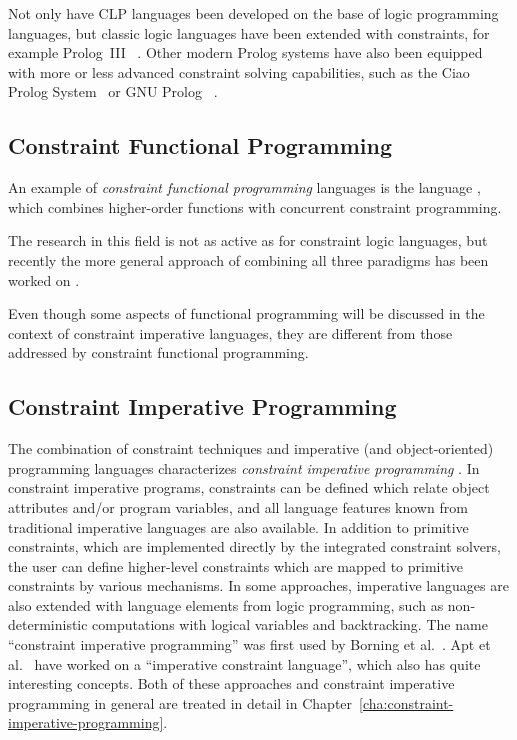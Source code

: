 Not only have CLP languages been developed on the base of logic
programming languages, but classic logic languages have been extended
with constraints, for example Prolog~III%
~\cite{colmerauer90prologIII}.  Other modern Prolog
systems have also been equipped with more or less advanced constraint
solving capabilities, such as the Ciao Prolog%
 System~\cite{bueno02ciao} or GNU
Prolog%
~\cite{gnuProlog}.


\subsection{Constraint Functional Programming}
\label{sec:constraint-functional-programming}

An example of {\em constraint functional programming}%
 languages is the language
\goffin{}%
 \cite{chakravarty97goffin}, which combines higher-order
functions with concurrent constraint programming.

The research in this field is not as active as for constraint logic
languages, but recently the more general approach of combining all
three paradigms has been worked on \cite{Hofstedt_02B,
  KobayashiMarinIdaChe.WFLP02}.

Even though some aspects of functional programming will be discussed
in the context of constraint imperative languages, they are different
from those addressed by constraint functional programming.

\subsection{Constraint Imperative Programming}

The combination of constraint techniques and imperative (and
object-oriented) programming languages characterizes {\em constraint
  imperative programming}%
.  In constraint imperative
programs, constraints can be defined which relate object attributes
and/or program variables, and all language features known from
traditional imperative languages are also available.  In addition to
primitive constraints, which are implemented directly by the
integrated constraint solvers, the user can define higher-level
constraints which are mapped to primitive constraints by various
mechanisms.  In some approaches, imperative languages are also
extended with language elements from logic programming, such as
non-deterministic computations with logical variables and
backtracking.  The name ``constraint imperative programming'' was
first used by Borning%
 et
al.~\cite{lopez94kaleidoscope,freemanbenson90design}.  Apt%
 et al.~\cite{apt97search, apt98alma, apt98almaproject}
have worked on a ``imperative constraint language'', which also has
quite interesting concepts.  Both of these approaches and constraint
imperative programming in general are treated in detail in
Chapter~\ref{cha:constraint-imperative-programming}.


